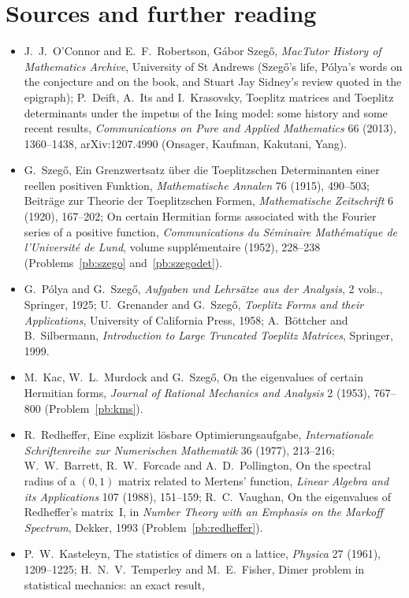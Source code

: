 \section*{Sources and further reading}

\begin{itemize}
\item J.~J.~O'Connor and E.~F.~Robertson, Gábor Szegő, \emph{MacTutor History of Mathematics Archive}, University of St Andrews (Szegő's life, Pólya's words on the conjecture and on the book, and
Stuart Jay Sidney's review quoted in the epigraph); P.~Deift, A.~Its and I.~Krasovsky, Toeplitz matrices and Toeplitz determinants under the impetus of the Ising model: some history and some
recent results, \emph{Communications on Pure and Applied Mathematics} 66 (2013), 1360--1438, arXiv:1207.4990 (Onsager, Kaufman, Kakutani, Yang).
\item G.~Szegő, Ein Grenzwertsatz über die Toeplitzschen Determinanten einer reellen positiven Funktion, \emph{Mathematische Annalen} 76 (1915), 490--503; Beiträge zur Theorie der Toeplitzschen
Formen, \emph{Mathematische Zeitschrift} 6 (1920), 167--202; On certain Hermitian forms associated with the Fourier series of a positive function, \emph{Communications du Séminaire Mathématique de
l'Université de Lund}, volume supplémentaire (1952), 228--238 (Problems~\ref{pb:szego} and~\ref{pb:szegodet}).
\item G.~Pólya and G.~Szegő, \emph{Aufgaben und Lehrsätze aus der Analysis}, 2 vols., Springer, 1925; U.~Grenander and G.~Szegő, \emph{Toeplitz Forms and their Applications}, University of
California Press, 1958; A.~Böttcher and B.~Silbermann, \emph{Introduction to Large Truncated Toeplitz Matrices}, Springer, 1999.
\item M.~Kac, W.~L.~Murdock and G.~Szegő, On the eigenvalues of certain Hermitian forms, \emph{Journal of Rational Mechanics and Analysis} 2 (1953), 767--800 (Problem~\ref{pb:kms}).
\item R.~Redheffer, Eine explizit lösbare Optimierungsaufgabe, \emph{Internationale Schriftenreihe zur Numerischen Mathematik} 36 (1977), 213--216; W.~W.~Barrett, R.~W.~Forcade and A.~D.~Pollington,
On the spectral radius of a $(0,1)$ matrix related to Mertens' function, \emph{Linear Algebra and its Applications} 107 (1988), 151--159; R.~C.~Vaughan, On the eigenvalues of Redheffer's
matrix~I, in \emph{Number Theory with an Emphasis on the Markoff Spectrum}, Dekker, 1993 (Problem~\ref{pb:redheffer}).
\item P.~W.~Kasteleyn, The statistics of dimers on a lattice, \emph{Physica} 27 (1961), 1209--1225; H.~N.~V.~Temperley and M.~E.~Fisher, Dimer problem in statistical mechanics: an exact result,

\end{itemize}
